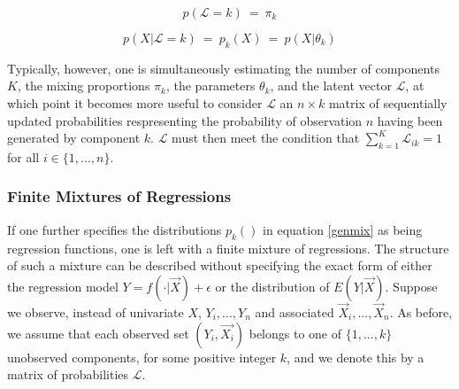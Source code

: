 \documentclass[10pt]{olplainarticle}\usepackage[]{graphicx}\usepackage[]{color}
\begin{document}
\begin{equation} \label{latentdist}
  p(\mathcal{L} = k) \ =\ \pi_k
\end{equation}

\begin{equation} \label{genmixcond}
  p(X | \mathcal{L} = k) \ =\ p_k(X) \ =\ p(X | \theta_k)
\end{equation}


Typically, however, one is simultaneously estimating the number of components $K$, the mixing proportions $\pi_k$, the parameters $\theta_k$, and the latent vector $\mathcal{L}$, at which point it becomes more useful to consider $\boldsymbol{\mathcal{L}}$ an $n \times k$ matrix of sequentially updated probabilities respresenting the probability of observation $n$ having been generated by component $k$. $\boldsymbol{\mathcal{L}}$ must then meet the condition that $\sum_{k=1}^{K}\boldsymbol{\mathcal{L}}_{ik} = 1$ for all $i \in \{1,...,n\}$.

% 

\subsubsection{Finite Mixtures of Regressions}

If one further specifies the distributions $p_k()$ in equation \ref{genmix} as being regression functions, one is left with a finite mixture of regressions. The structure of such a mixture can be described without specifying the exact form of either the regression model $Y = f(\cdot|\vec{X}) + \epsilon$ or the distribution of $E(Y|\vec{X})$. Suppose we observe, instead of univariate $X$, $Y_i,...,Y_n$ and associated $\vec{X}_i,...,\vec{X}_n$. As before, we assume that each observed set $(Y_i, \vec{X_i})$ belongs to one of $\{1,...,k\}$ unobserved components, for some positive integer $k$, and we denote this by a matrix of probabilities $\boldsymbol{\mathcal{L}}$.
\end{document}
